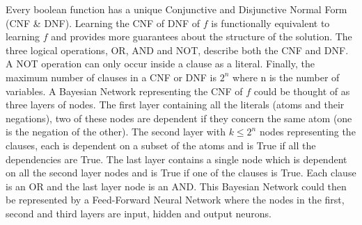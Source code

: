 Every boolean function has a unique Conjunctive and Disjunctive Normal Form (CNF \& DNF). Learning the CNF of DNF of $f$ is functionally equivalent to learning $f$ and provides more guarantees about the structure of the solution. The three logical operations, OR, AND and NOT, describe both the CNF and DNF. A NOT operation can only occur inside a clause as a literal. Finally, the maximum number of clauses in a CNF or DNF is $2^n$ where n is the number of variables. A Bayesian Network representing the CNF of $f$ could be thought of as three layers of nodes. The first layer containing all the literals (atoms and their negations), two of these nodes are dependent if they concern the same atom (one is the negation of the other). The second layer with $k \leq 2^n$ nodes representing the clauses, each is dependent on a subset of the atoms and is True if all the dependencies are True. The last layer contains a single node which is dependent on all the second layer nodes and is True if one of the clauses is True. Each clause is an OR and the last layer node is an AND. This Bayesian Network could then be represented by a Feed-Forward Neural Network where the nodes in the first, second and third layers are input, hidden and output neurons.

